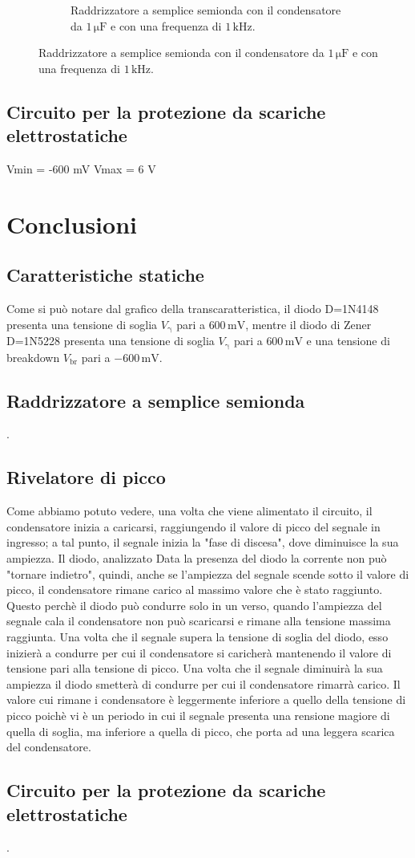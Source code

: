 \documentclass[a4paper]{article}
\begin{document}
\begin{figure}[h!]
\begin{subfigure}{1\textwidth}
						\caption{Raddrizzatore a semplice semionda con il condensatore da $ 1 \, \mathrm{\mu F} $ e con una frequenza di $ 1 \, \mathrm{kHz} $.}
					\end{subfigure}
					\label{fig:raddrizzatoreASempliceSemionda1micro}
				\end{figure}
				\newpage
		\subsection{Circuito per la protezione da scariche elettrostatiche}
			Vmin = -600 mV
			Vmax = 6 V
	\section{Conclusioni}
		\subsection{Caratteristiche statiche}
			Come si può notare dal grafico della transcaratteristica, il diodo D=1N4148 presenta una tensione di soglia $ V_{\mathrm{\gamma}} $ pari a $ 600 \, \mathrm{mV} $, mentre il diodo di Zener D=1N5228 presenta una tensione di soglia $ V_{\mathrm{\gamma}} $ pari a $ 600 \, \mathrm{mV} $ e  una tensione di breakdown $ V_{\mathrm{br}} $ pari a $ -600 \, \mathrm{mV} $.
		\subsection{Raddrizzatore a semplice semionda}
			.
		\subsection{Rivelatore di picco}
			Come abbiamo potuto vedere, una volta che viene alimentato il circuito, il condensatore inizia a caricarsi, raggiungendo il valore di picco del segnale in ingresso; a tal punto, il segnale inizia la "fase di discesa", dove diminuisce la sua ampiezza. Il diodo, analizzato
			Data la presenza del diodo la corrente non può "tornare indietro", quindi, anche se l'ampiezza del segnale scende sotto il valore di picco, il condensatore rimane carico al massimo valore che è stato raggiunto.
			Questo perchè il diodo può condurre solo in un verso, quando l'ampiezza del segnale cala il condensatore non può scaricarsi e rimane alla tensione massima raggiunta.
			Una volta che il segnale supera la tensione di soglia del diodo, esso inizierà a condurre per cui il condensatore si caricherà mantenendo il valore di tensione pari alla tensione di picco.
			Una volta che il segnale diminuirà la sua ampiezza il diodo smetterà di condurre per cui il condensatore rimarrà carico.
			Il valore  cui rimane i condensatore è leggermente inferiore a quello della tensione di picco poichè vi è un periodo in cui il segnale presenta una rensione magiore di quella di soglia, ma inferiore a quella di picco, che porta ad una leggera scarica del condensatore.
		\subsection{Circuito per la protezione da scariche elettrostatiche}
			.
\end{document}

